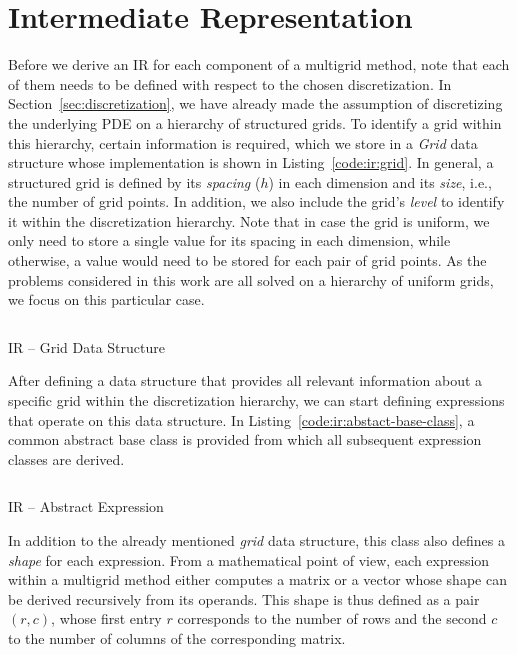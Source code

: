 \section{Intermediate Representation}
\label{sec:intermediate-representation}
Before we derive an IR for each component of a multigrid method, note that each of them needs to be defined with respect to the chosen discretization.
In Section~\ref{sec:discretization}, we have already made the assumption of discretizing the underlying PDE on a hierarchy of structured grids.
To identify a grid within this hierarchy, certain information is required, which we store in a \emph{Grid} data structure whose implementation is shown in Listing~\ref{code:ir:grid}.
In general, a structured grid is defined by its \emph{spacing} ($h$) in each dimension and its \emph{size}, i.e., the number of grid points.
In addition, we also include the grid's \emph{level} to identify it within the discretization hierarchy.
Note that in case the grid is uniform, we only need to store a single value for its spacing in each dimension, while otherwise, a value would need to be stored for each pair of grid points.
As the problems considered in this work are all solved on a hierarchy of uniform grids, we focus on this particular case.
\begin{listing}
	\inputminted{python}{evostencils/ir/grid.py}
	\caption{IR -- Grid Data Structure}
	\label{code:ir:grid}
\end{listing}
After defining a data structure that provides all relevant information about a specific grid within the discretization hierarchy, we can start defining expressions that operate on this data structure.
In Listing~\ref{code:ir:abstact-base-class}, a common abstract base class is provided from which all subsequent expression classes are derived.
\begin{listing}
	\inputminted{python}{evostencils/ir/expression.py}
	\caption{IR -- Abstract Expression}
	\label{code:ir:abstact-base-class}
\end{listing}
In addition to the already mentioned \emph{grid} data structure, this class also defines a \emph{shape} for each expression.
From a mathematical point of view, each expression within a multigrid method either computes a matrix or a vector whose shape can be derived recursively from its operands.
This shape is thus defined as a pair $(r, c)$, whose first entry $r$ corresponds to the number of rows and the second $c$ to the number of columns of the corresponding matrix.

